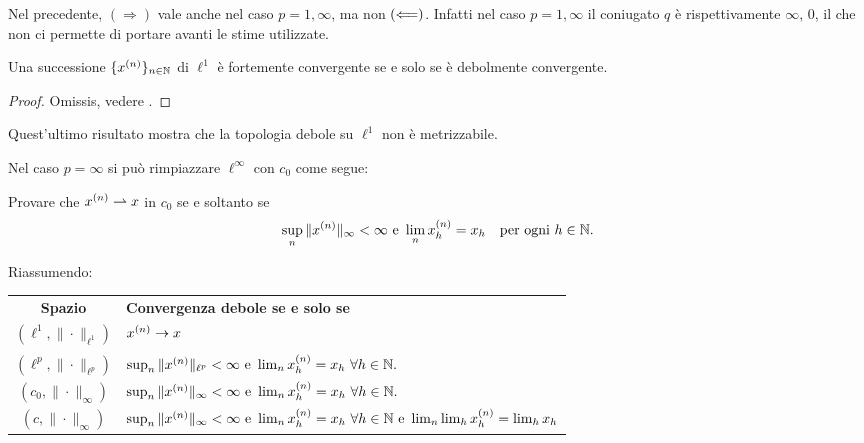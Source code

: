\begin{remark}
	Nel precedente, $(\Longrightarrow)$ vale anche nel caso $p=1,\infty$, ma non $(\Longleftarrow)$. Infatti nel caso $p=1,\infty$ il coniugato $q$ è rispettivamente $\infty$, $0$, il che non ci permette di portare avanti le stime utilizzate.
\end{remark}

\begin{theorem}
	Una successione $\{x^{(n)}\}_{n \in \mathbb{N}}$ di $\ell^1$ è fortemente convergente se e solo se è debolmente convergente.
\end{theorem}
\begin{proof}
	Omissis, vedere \cite{dunford1958linear}.
\end{proof}

\begin{remark}
	Quest'ultimo risultato mostra che la topologia debole su $\ell^1$ non è metrizzabile.
\end{remark}

\begin{remark}
	Nel caso $p=\infty$ si può rimpiazzare $\ell^\infty$ con $c_0$ come segue:
\end{remark}

\begin{exercise}
	Provare che $x^{(n)} \rightharpoonup x$ in $c_0$ se e soltanto se
	\begin{equation*}
		\sup_n \|x^{(n)}\|_{\infty} < \infty \ \text{e}\ \lim_n x^{(n)}_h = x_h \quad \text{per ogni $h \in \mathbb{N}$}.
	\end{equation*}
\end{exercise}

Riassumendo:

\begin{center}
	\begin{tabular}{cl}
		\textbf{Spazio} & \textbf{Convergenza debole se e solo se}\\
		$(\ell^1, \|\cdot\|_{\ell^1})$ & $x^{(n)} \underset{{}}{\rightarrow} x$\\
		$(\ell^p, \|\cdot\|_{\ell^p})$ & $\sup_n \|x^{(n)}\|_{\ell^p} < \infty \ \text{e}\ \lim_n x^{(n)}_h = x_h \ \forall h \in \N.$\\
		$(c_0, \|\cdot\|_\infty)$ & $\sup_n \|x^{(n)}\|_{\infty} < \infty \ \text{e}\ \lim_n x^{(n)}_h = x_h \ \forall h \in \N.$\\
		$(c, \|\cdot\|_\infty)$ & $\sup_n \|x^{(n)}\|_{\infty} < \infty \ \text{e}\ \lim_n x^{(n)}_h = x_h \ \forall h \in \N \ \text{e}\ \lim_n\lim_h x^{(n)}_h = \lim_h x_h$
	\end{tabular}
\end{center}

